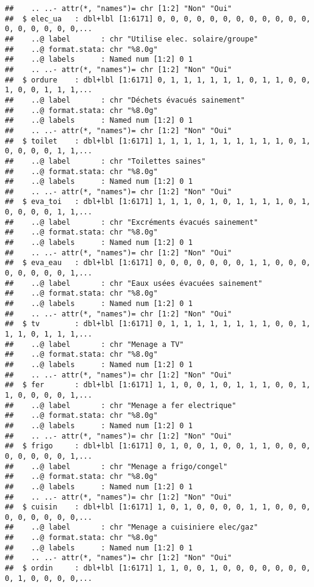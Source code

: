 \documentclass[
]{article}
\begin{document}
\begin{verbatim}
##    .. ..- attr(*, "names")= chr [1:2] "Non" "Oui"
##  $ elec_ua   : dbl+lbl [1:6171] 0, 0, 0, 0, 0, 0, 0, 0, 0, 0, 0, 0, 0, 0, 0, 0, 0, 0,...
##    ..@ label       : chr "Utilise elec. solaire/groupe"
##    ..@ format.stata: chr "%8.0g"
##    ..@ labels      : Named num [1:2] 0 1
##    .. ..- attr(*, "names")= chr [1:2] "Non" "Oui"
##  $ ordure    : dbl+lbl [1:6171] 0, 1, 1, 1, 1, 1, 1, 0, 1, 1, 0, 0, 1, 0, 0, 1, 1, 1,...
##    ..@ label       : chr "Déchets évacués sainement"
##    ..@ format.stata: chr "%8.0g"
##    ..@ labels      : Named num [1:2] 0 1
##    .. ..- attr(*, "names")= chr [1:2] "Non" "Oui"
##  $ toilet    : dbl+lbl [1:6171] 1, 1, 1, 1, 1, 1, 1, 1, 1, 1, 0, 1, 0, 0, 0, 0, 1, 1,...
##    ..@ label       : chr "Toilettes saines"
##    ..@ format.stata: chr "%8.0g"
##    ..@ labels      : Named num [1:2] 0 1
##    .. ..- attr(*, "names")= chr [1:2] "Non" "Oui"
##  $ eva_toi   : dbl+lbl [1:6171] 1, 1, 1, 0, 1, 0, 1, 1, 1, 1, 0, 1, 0, 0, 0, 0, 1, 1,...
##    ..@ label       : chr "Excréments évacués sainement"
##    ..@ format.stata: chr "%8.0g"
##    ..@ labels      : Named num [1:2] 0 1
##    .. ..- attr(*, "names")= chr [1:2] "Non" "Oui"
##  $ eva_eau   : dbl+lbl [1:6171] 0, 0, 0, 0, 0, 0, 0, 1, 1, 0, 0, 0, 0, 0, 0, 0, 0, 1,...
##    ..@ label       : chr "Eaux usées évacuées sainement"
##    ..@ format.stata: chr "%8.0g"
##    ..@ labels      : Named num [1:2] 0 1
##    .. ..- attr(*, "names")= chr [1:2] "Non" "Oui"
##  $ tv        : dbl+lbl [1:6171] 0, 1, 1, 1, 1, 1, 1, 1, 1, 0, 0, 1, 1, 1, 0, 1, 1, 1,...
##    ..@ label       : chr "Menage a TV"
##    ..@ format.stata: chr "%8.0g"
##    ..@ labels      : Named num [1:2] 0 1
##    .. ..- attr(*, "names")= chr [1:2] "Non" "Oui"
##  $ fer       : dbl+lbl [1:6171] 1, 1, 0, 0, 1, 0, 1, 1, 1, 0, 0, 1, 1, 0, 0, 0, 0, 1,...
##    ..@ label       : chr "Menage a fer electrique"
##    ..@ format.stata: chr "%8.0g"
##    ..@ labels      : Named num [1:2] 0 1
##    .. ..- attr(*, "names")= chr [1:2] "Non" "Oui"
##  $ frigo     : dbl+lbl [1:6171] 0, 1, 0, 0, 1, 0, 0, 1, 1, 0, 0, 0, 0, 0, 0, 0, 0, 1,...
##    ..@ label       : chr "Menage a frigo/congel"
##    ..@ format.stata: chr "%8.0g"
##    ..@ labels      : Named num [1:2] 0 1
##    .. ..- attr(*, "names")= chr [1:2] "Non" "Oui"
##  $ cuisin    : dbl+lbl [1:6171] 1, 0, 1, 0, 0, 0, 0, 1, 1, 0, 0, 0, 0, 0, 0, 0, 0, 0,...
##    ..@ label       : chr "Menage a cuisiniere elec/gaz"
##    ..@ format.stata: chr "%8.0g"
##    ..@ labels      : Named num [1:2] 0 1
##    .. ..- attr(*, "names")= chr [1:2] "Non" "Oui"
##  $ ordin     : dbl+lbl [1:6171] 1, 1, 0, 0, 1, 0, 0, 0, 0, 0, 0, 0, 0, 1, 0, 0, 0, 0,...

\end{verbatim}
\end{document}

